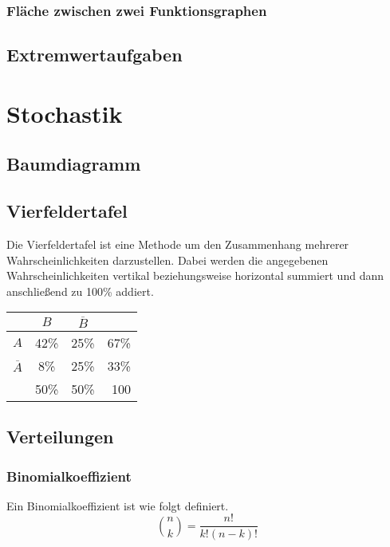 \documentclass[a4paper]{article}
\begin{document}
			\subsubsection{Fläche zwischen zwei Funktionsgraphen}
		\subsection{Extremwertaufgaben}

	\section{Stochastik}
		\subsection{Baumdiagramm}
		\subsection{Vierfeldertafel}
			Die Vierfeldertafel ist eine Methode um den Zusammenhang mehrerer Wahrscheinlichkeiten darzustellen. Dabei werden die angegebenen Wahrscheinlichkeiten vertikal beziehungsweise horizontal summiert und dann anschließend zu 100\% addiert.
			
			\setlength{\tabcolsep}{10pt}
			\renewcommand{\arraystretch}{1.5}
			\begin{center}
				\begin{tabular}{ l | c | c | r }
									& $B$ 	& $\overline{B}$ 	& 		\\ \hline
					$A$ 			& 42\% 	& 25\% 				& 67\%	\\ \hline
					$\overline{A}$ 	& 8\% 	& 25\%				& 33\% 	\\ \hline
					& 50\% 	& 50\% 				& 100
				\end{tabular}
			\end{center}
		\subsection{Verteilungen}
			\subsubsection{Binomialkoeffizient}
				Ein Binomialkoeffizient ist wie folgt definiert.
				\begin{equation}
					\binom{n}{k} = \frac{n!}{k! (n-k)!}
				\end{equation}
\end{document}

